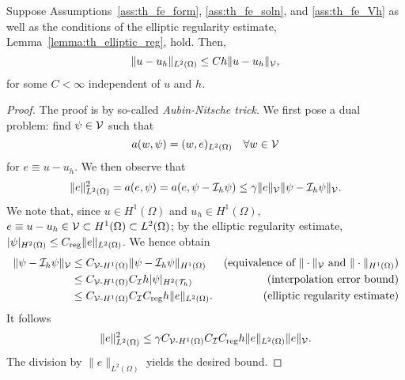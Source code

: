 \begin{proposition}
  \label{prop:th_aubin_nitsche}
  Suppose Assumptions~\ref{ass:th_fe_form}, \ref{ass:th_fe_soln}, and \ref{ass:th_fe_Vh} as well as the conditions of the elliptic regularity estimate, Lemma~\ref{lemma:th_elliptic_reg}, hold. Then, 
  \begin{equation*}
    \| u - u_h \|_{L^2(\Omega)} \leq C h \| u-u_h \|_{\mathcal{V}},
  \end{equation*}
  for some $C < \infty$ independent of $u$ and $h$.
  \begin{proof}
    The proof is by so-called \emph{Aubin-Nitsche trick}. We first pose a dual problem: find $\psi \in \mathcal{V}$ such that
    \begin{equation*}
      a(w,\psi) = (w,e)_{L^2(\Omega)} \quad \forall w \in \mathcal{V}
    \end{equation*}
    for $e \equiv u - u_h$. We then observe that
    \begin{equation*}
      \| e \|_{L^2(\Omega)}^2 = a(e, \psi)
      = a(e, \psi - \mathcal{I}_h \psi)
      \leq \gamma \| e \|_{\mathcal{V}} \| \psi - \mathcal{I}_h \psi \|_{\mathcal{V}}.
    \end{equation*}
    We note that, since $u \in H^1(\Omega)$ and $u_h \in H^1(\Omega)$,  $e \equiv u - u_h \in \mathcal{V} \subset H^1(\Omega) \subset L^2(\Omega)$; by the elliptic regularity estimate, $| \psi |_{H^2(\Omega)} \leq C_{\rm reg} \| e \|_{L^2(\Omega)}$. We hence obtain
    \begin{align*}
      \| \psi - \mathcal{I}_h \psi \|_{\mathcal{V}}
      &\leq C_{\mathcal{V}\text{-}H^1(\Omega)} \| \psi - \mathcal{I}_h \psi \|_{H^1(\Omega)} & \text{(equivalence of $\| \cdot \|_{\mathcal{V}}$ and $\| \cdot \|_{H^1(\Omega)}$)} \\
      &\leq C_{\mathcal{V}\text{-}H^1(\Omega)}C_{\mathcal{I}} h | \psi |_{H^2(\mathcal{T}_h)} & \text{(interpolation error bound)}\\
      &\leq C_{\mathcal{V}\text{-}H^1(\Omega)}C_{\mathcal{I}} C_{\rm reg} h  \| e \|_{L^2(\Omega)}. & \text{(elliptic regularity estimate)}
    \end{align*}
    It follows
    \begin{equation*}
      \| e \|_{L^2(\Omega)}^2 \leq \gamma C_{\mathcal{V}\text{-}H^1(\Omega)}C_{\mathcal{I}} C_{\rm reg} h \| e \|_{L^2(\Omega)} \| e \|_{\mathcal{V}} .
    \end{equation*}
    The division by $\| e \|_{L^2(\Omega)}$ yields the desired bound.
  \end{proof}
\end{proposition}

